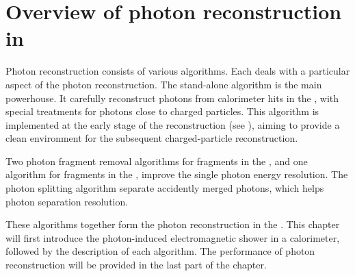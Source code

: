 \section{Overview of photon reconstruction in \pandora}

Photon reconstruction consists of various algorithms. Each deals with a particular aspect of the photon reconstruction. The stand-alone \PhotonReconstruction algorithm is the main powerhouse. It carefully reconstruct photons from calorimeter hits in the \ECAL, with special treatments for photons close to charged particles. This algorithm is implemented at the early stage of the reconstruction (see ), aiming to provide a clean environment for the subsequent charged-particle reconstruction.

Two photon fragment removal algorithms for fragments in the \ECAL, and one algorithm for fragments in the \HCAL, improve the single photon energy resolution. The photon splitting algorithm separate accidently merged photons, which helps photon separation resolution.

These algorithms together form the photon reconstruction in the \pandora. This chapter will first introduce the photon-induced electromagnetic shower in a calorimeter, followed by the description of each algorithm. The performance of photon reconstruction will be provided in the last part of the chapter.

